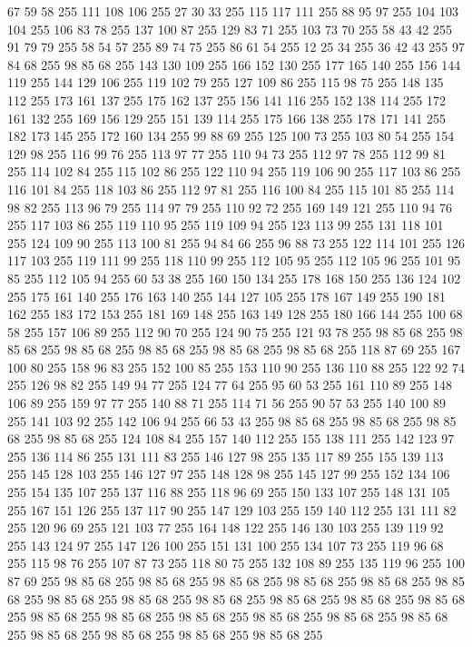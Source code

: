 67 59 58 255 111 108 106 255 27 30 33 255 115 117 111 255 88 95 97 255 104 103 104 255 106 83 78 255 137 100 87 255 129 83 71 255 103 73 70 255 58 43 42 255 91 79 79 255 58 54 57 255 89 74 75 255 86 61 54 255 12 25 34 255 36 42 43 255 97 84 68 255 98 85 68 255 143 130 109 255 166 152 130 255 177 165 140 255 156 144 119 255 144 129 106 255 119 102 79 255 127 109 86 255 115 98 75 255 148 135 112 255 173 161 137 255 175 162 137 255 156 141 116 255 152 138 114 255 172 161 132 255 169 156 129 255 151 139 114 255 175 166 138 255 178 171 141 255 182 173 145 255 172 160 134 255 99 88 69 255 125 100 73 255 103 80 54 255 154 129 98 255 116 99 76 255 113 97 77 255 110 94 73 255 112 97 78 255 112 99 81 255 114 102 84 255 115 102 86 255 122 110 94 255 119 106 90 255 117 103 86 255 116 101 84 255 118 103 86 255 112 97 81 255 116 100 84 255 115 101 85 255 114 98 82 255 113 96 79 255 114 97 79 255 110 92 72 255 169 149 121 255 110 94 76 255
117 103 86 255 119 110 95 255 119 109 94 255 123 113 99 255 131 118 101 255 124 109 90 255 113 100 81 255 94 84 66 255 96 88 73 255 122 114 101 255 126 117 103 255 119 111 99 255 118 110 99 255 112 105 95 255 112 105 96 255 101 95 85 255 112 105 94 255 60 53 38 255 160 150 134 255 178 168 150 255 136 124 102 255 175 161 140 255 176 163 140 255 144 127 105 255 178 167 149 255 190 181 162 255 183 172 153 255 181 169 148 255 163 149 128 255 180 166 144 255 100 68 58 255 157 106 89 255 112 90 70 255 124 90 75 255 121 93 78 255 98 85 68 255 98 85 68 255 98 85 68 255 98 85 68 255 98 85 68 255 98 85 68 255 118 87 69 255 167 100 80 255 158 96 83 255 152 100 85 255 153 110 90 255 136 110 88 255 122 92 74 255 126 98 82 255 149 94 77 255 124 77 64 255 95 60 53 255 161 110 89 255 148 106 89 255 159 97 77 255 140 88 71 255 114 71 56 255 90 57 53 255 140 100 89 255 141 103 92 255 142 106 94 255 66 53 43 255 98 85 68 255 98 85 68 255
98 85 68 255 98 85 68 255 124 108 84 255 157 140 112 255 155 138 111 255 142 123 97 255 136 114 86 255 131 111 83 255 146 127 98 255 135 117 89 255 155 139 113 255 145 128 103 255 146 127 97 255 148 128 98 255 145 127 99 255 152 134 106 255 154 135 107 255 137 116 88 255 118 96 69 255 150 133 107 255 148 131 105 255 167 151 126 255 137 117 90 255 147 129 103 255 159 140 112 255 131 111 82 255 120 96 69 255 121 103 77 255 164 148 122 255 146 130 103 255 139 119 92 255 143 124 97 255 147 126 100 255 151 131 100 255 134 107 73 255 119 96 68 255 115 98 76 255 107 87 73 255 118 80 75 255 132 108 89 255 135 119 96 255 100 87 69 255 98 85 68 255 98 85 68 255 98 85 68 255 98 85 68 255 98 85 68 255 98 85 68 255 98 85 68 255 98 85 68 255 98 85 68 255 98 85 68 255 98 85 68 255 98 85 68 255 98 85 68 255 98 85 68 255 98 85 68 255 98 85 68 255 98 85 68 255 98 85 68 255 98 85 68 255 98 85 68 255 98 85 68 255 98 85 68 255
